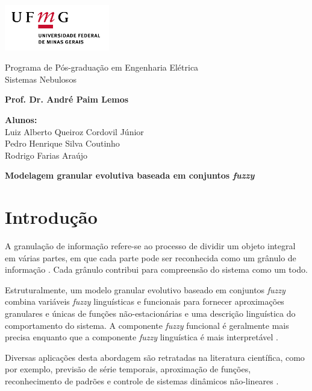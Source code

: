 \documentclass[12pt, a4paper]{article}
\begin{document}
	
\begin{minipage}[c][3cm][c]{3cm}
\includegraphics[height=2cm]{ufmg.jpg}
\end{minipage}
\begin{minipage}[c][3cm][c]{10cm}
\center
{\sc Programa de Pós-graduação em Engenharia Elétrica}\\
{\sc Sistemas Nebulosos}

\textbf{\footnotesize{Prof. Dr. André Paim Lemos}}
\smallskip
\end{minipage}

\vspace{.5cm}

\noindent \textbf{Alunos:}\\ 
Luiz Alberto Queiroz Cordovil Júnior\\
Pedro Henrique Silva Coutinho\\
Rodrigo Farias Araújo\\
\begin{center}
\textbf{Modelagem granular evolutiva baseada em conjuntos \textit{fuzzy}} %
\end{center}

\section{Introdução}

\hspace{0.4cm} A granulação de informação refere-se ao processo de dividir um objeto integral em várias partes, em que cada parte pode ser reconhecida como um grânulo de informação \citep{yin2017}. Cada grânulo contribui para compreensão do sistema como um todo.

Estruturalmente, um modelo granular evolutivo baseado em conjuntos \textit{fuzzy} combina variáveis \textit{fuzzy} linguísticas e funcionais para fornecer aproximações granulares e únicas de funções não-estacionárias e uma descrição linguística do comportamento do sistema. A componente \textit{fuzzy} funcional é geralmente mais precisa enquanto que a componente \textit{fuzzy} linguística é mais interpretável \citep{leite2011}.

Diversas aplicações desta abordagem são retratadas na literatura científica, como por exemplo, previsão de série temporais, aproximação de funções, reconhecimento de padrões e controle de sistemas dinâmicos não-lineares \citep{leite2015}.
\end{document}
